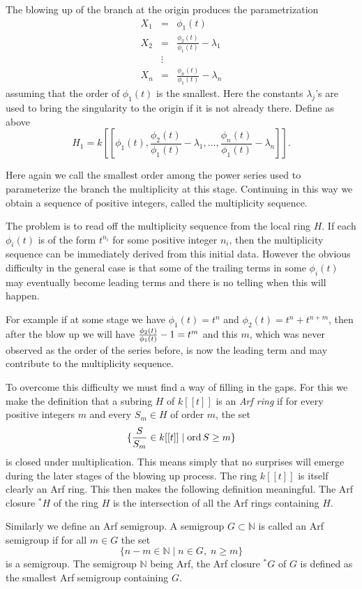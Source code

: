 \documentclass[12pt]{amsart}
\begin{document}
The blowing up of the branch at the origin produces the parametrization
\begin{eqnarray*}
X_1&=&\phi_1(t) \\
X_2&=&\frac{\phi_2(t)}{\phi_1(t)}-\lambda_1\\
&\vdots& \\
X_n &=&\frac{\phi_n(t)}{\phi_1(t)}-\lambda_n
\end{eqnarray*}
assuming that the order of $\phi_1(t)$ is the smallest. Here the constants $\lambda_j$'s are used to bring the singularity to the origin if it is not already there.
Define as above
\[ H_1=k[[\phi_1(t),\frac{\phi_2(t)}{\phi_1(t)}-\lambda_1, \dots, \frac{\phi_n(t)}{\phi_1(t)}-\lambda_n]]. \]

Here again we call the smallest order among the power series used to parameterize the branch the multiplicity at this stage. Continuing in this way we obtain a sequence of positive integers, called the multiplicity sequence.

The problem is to read off the multiplicity sequence from the local ring $H$.  If each $\phi_i(t)$ is of the form $t^{n_i}$ for some positive integer $n_i$, then the multiplicity sequence can be immediately derived from this initial data. However the obvious difficulty in the general case is that some of the trailing terms in some $\phi_i(t)$ may eventually become leading terms and there is no telling when this will happen.

For example if at some stage we have $\phi_1(t)=t^n$ and $\phi_2(t)=t^n+t^{n+m}$, then after the blow up we will have ${\displaystyle} \frac{\phi_2(t)}{\phi_1(t)}-1=t^m$ and this $m$, which was never observed as the order of the series before, is now the leading term and may contribute to the multiplicity sequence.

To overcome this difficulty we must find a way of filling in the gaps.  For this we make the definition that a subring $H$ of $k[[t]]$ is an \emph{Arf ring} if for every positive integers $m$ and every $S_m\in H$ of order $m$, the set
\[ \{ \frac{S}{S_m}\in k[[t]] \; | \; {\mbox{\rm ord}\, }{S}\geq m \} \]
is closed under multiplication. This means simply that no surprises will emerge during the later stages of the blowing up process. The ring $k[[t]]$ is itself clearly an Arf ring. This then makes the following definition meaningful. The Arf closure ${\mbox{}^\ast \! } H$ of the ring $H$ is the intersection of all the Arf rings containing $H$.

Similarly we define an Arf semigroup. A semigroup $G\subset{\mathbb{N}}$ is called an Arf semigroup if for all $m\in G$ the set
\[ \{ n-m\in {\mathbb{N}} \; | \; n\in G, \; n\geq m \} \]
is a semigroup. The semigroup ${\mathbb{N}}$ being Arf, the Arf closure ${\mbox{}^\ast \! } G$ of $G$ is defined as the smallest Arf semigroup containing $G$.
\end{document}
